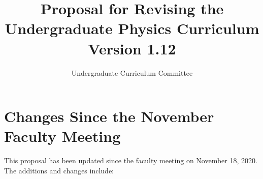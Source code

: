 \documentclass[12pt]{article}
\begin{document}

\title{Proposal for Revising the \\ Undergraduate Physics Curriculum \\ Version 1.12}
\author{Undergraduate Curriculum Committee}

\maketitle

\section{Changes Since the November Faculty Meeting}
This proposal has been updated since the faculty meeting on November
18, 2020.  The additions and changes include:
\end{document}
